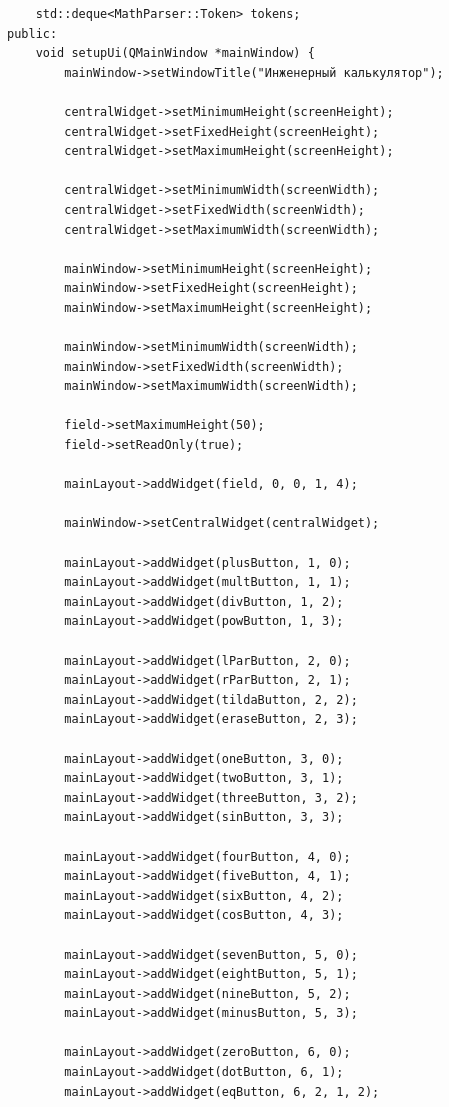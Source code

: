 \documentclass[a4paper,14pt]{extarticle}
\begin{document}
\begin{verbatim}
    std::deque<MathParser::Token> tokens;
public:
    void setupUi(QMainWindow *mainWindow) {
        mainWindow->setWindowTitle("Инженерный калькулятор");

        centralWidget->setMinimumHeight(screenHeight);
        centralWidget->setFixedHeight(screenHeight);
        centralWidget->setMaximumHeight(screenHeight);

        centralWidget->setMinimumWidth(screenWidth);
        centralWidget->setFixedWidth(screenWidth);
        centralWidget->setMaximumWidth(screenWidth);

        mainWindow->setMinimumHeight(screenHeight);
        mainWindow->setFixedHeight(screenHeight);
        mainWindow->setMaximumHeight(screenHeight);

        mainWindow->setMinimumWidth(screenWidth);
        mainWindow->setFixedWidth(screenWidth);
        mainWindow->setMaximumWidth(screenWidth);

        field->setMaximumHeight(50);
        field->setReadOnly(true);

        mainLayout->addWidget(field, 0, 0, 1, 4);

        mainWindow->setCentralWidget(centralWidget);

        mainLayout->addWidget(plusButton, 1, 0);
        mainLayout->addWidget(multButton, 1, 1);
        mainLayout->addWidget(divButton, 1, 2);
        mainLayout->addWidget(powButton, 1, 3);

        mainLayout->addWidget(lParButton, 2, 0);
        mainLayout->addWidget(rParButton, 2, 1);
        mainLayout->addWidget(tildaButton, 2, 2);
        mainLayout->addWidget(eraseButton, 2, 3);

        mainLayout->addWidget(oneButton, 3, 0);
        mainLayout->addWidget(twoButton, 3, 1);
        mainLayout->addWidget(threeButton, 3, 2);
        mainLayout->addWidget(sinButton, 3, 3);

        mainLayout->addWidget(fourButton, 4, 0);
        mainLayout->addWidget(fiveButton, 4, 1);
        mainLayout->addWidget(sixButton, 4, 2);
        mainLayout->addWidget(cosButton, 4, 3);

        mainLayout->addWidget(sevenButton, 5, 0);
        mainLayout->addWidget(eightButton, 5, 1);
        mainLayout->addWidget(nineButton, 5, 2);
        mainLayout->addWidget(minusButton, 5, 3);

        mainLayout->addWidget(zeroButton, 6, 0);
        mainLayout->addWidget(dotButton, 6, 1);
        mainLayout->addWidget(eqButton, 6, 2, 1, 2);


\end{verbatim}
\end{document}
